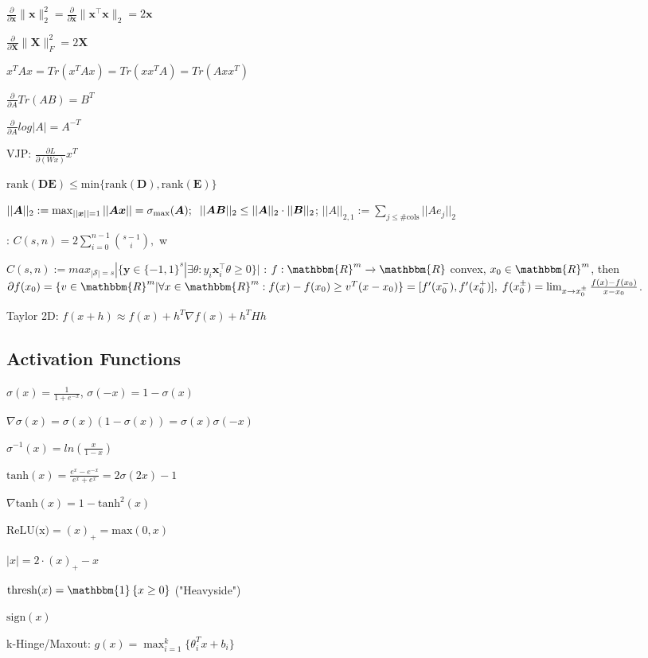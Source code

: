 \begin{inparaitem}[$\color{mygreen} \triangleright$]
	\item $\frac{\partial}{\partial \mathbf{x}}\|\mathbf{x}\|^2_2 = \frac{\partial}{\partial \mathbf{x}} \|\mathbf{x}^\top \mathbf{x}\|_2 = 2\mathbf{x}$ \quad
	\item $\frac{\partial}{\partial \mathbf{X}}\|\mathbf{X}\|_F^2 = 2\mathbf{X}$ \\
	\item $x^T A x = Tr(x^T A x) = Tr(x x^T A) = Tr(A x x^T)$ \\
	\item $\tfrac{\partial}{\partial A} Tr(AB) {=} B^T$ \quad
	\item $\frac{\partial}{\partial A} log|A| {=} A^{-T}$ \\
	\item VJP: $\frac{\partial L}{\partial (Wx)}x^T$
\end{inparaitem}

 $\text{rank}(\mathbf{D}\mathbf{E}) \leq \text{min}\{ \text{rank}(\mathbf{D}), \text{rank}(\mathbf{E})\}$

 $||\boldsymbol{A}||_2:=\max_{||\boldsymbol{x}||=1}||\boldsymbol{A}\boldsymbol{x}||=\sigma_{\max}(\boldsymbol{A});\; $
$||\boldsymbol{A}\boldsymbol{B}||_2\leq ||\boldsymbol{A}||_2\cdot||\boldsymbol{B}||_2$;
$||A||_{2,1}:=\sum_{j\le \#\text{cols}} ||Ae_j||_2$

:
$C(s, n) = 2 \sum_{i=0}^{n-1} \binom{s-1}{i},$ w

$C(s, n) := max_{|\mathcal{S}| = s}|\{\mathbf{y} \in \{-1, 1\}^s|\exists \theta : y_i \mathbf{x}_i^{\top} \theta \geq 0\}|$
: $f:\mathbbm{R}^m\xrightarrow[]{}\mathbbm{R}$ convex, $x_0 \in \mathbbm{R}^m$, then $\partial f(x_0) = \{v \in \mathbbm{R}^m | \forall x \in \mathbbm{R}^m: f(x) - f(x_0) \ge v^T (x - x_0) \}=[f'(x_0^-),f'(x_0^+)],\; f(x_0^{\pm})=\lim_{x\rightarrow x_0^{\pm}}\frac{f(x)-f(x_0)}{x-x_0}$.

Taylor 2D: $f(x+h)\approx f(x)+h^T\nabla f(x)+h^THh$

\subsection*{Activation Functions}
\begin{inparaitem}[$\color{mygreen} \triangleright$]
	\item $\sigma(x) = \frac{1}{1+e^{-x}}$, $\sigma(-x) = 1 - \sigma(x)$
	\item $\nabla \sigma(x) = \sigma(x)(1-\sigma(x)) = \sigma(x)\sigma(-x)$
	\item $\sigma^{-1}(x) = ln \left( \frac{x}{1 - x} \right)$
	\item $\text{tanh}(x) {=} \frac{e^{x}-e^{-x}}{e^{x} + e^{x}} = 2\sigma(2x) - 1$
	\item $\nabla \text{tanh}(x) = 1-\text{tanh}^2(x)$
	\item $\text{ReLU(x)} = (x)_+ = \text{max}(0, x)$
	\item $|x| = 2 \cdot (x)_+  - x$
	\item $\text{thresh}(x) = \mathbbm{1} \left\{ x \geq 0\right\}$ ("Heavyside")
	\item $\text{sign}(x)$
	\item k-Hinge/Maxout: $g(x) = \max_{i=1}^{k}\{\theta_i^T x + b_i\}$
\end{inparaitem}
